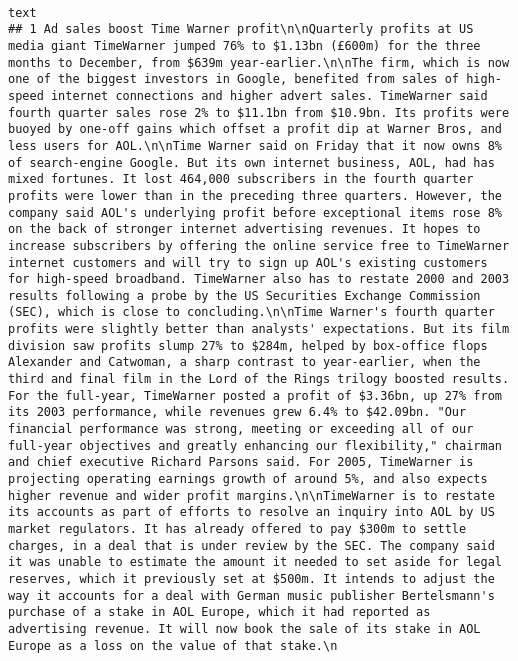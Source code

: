 \documentclass[
]{article}
\begin{document}
\begin{verbatim}
                                                                                                                    text
## 1 Ad sales boost Time Warner profit\n\nQuarterly profits at US media giant TimeWarner jumped 76% to $1.13bn (£600m) for the three months to December, from $639m year-earlier.\n\nThe firm, which is now one of the biggest investors in Google, benefited from sales of high-speed internet connections and higher advert sales. TimeWarner said fourth quarter sales rose 2% to $11.1bn from $10.9bn. Its profits were buoyed by one-off gains which offset a profit dip at Warner Bros, and less users for AOL.\n\nTime Warner said on Friday that it now owns 8% of search-engine Google. But its own internet business, AOL, had has mixed fortunes. It lost 464,000 subscribers in the fourth quarter profits were lower than in the preceding three quarters. However, the company said AOL's underlying profit before exceptional items rose 8% on the back of stronger internet advertising revenues. It hopes to increase subscribers by offering the online service free to TimeWarner internet customers and will try to sign up AOL's existing customers for high-speed broadband. TimeWarner also has to restate 2000 and 2003 results following a probe by the US Securities Exchange Commission (SEC), which is close to concluding.\n\nTime Warner's fourth quarter profits were slightly better than analysts' expectations. But its film division saw profits slump 27% to $284m, helped by box-office flops Alexander and Catwoman, a sharp contrast to year-earlier, when the third and final film in the Lord of the Rings trilogy boosted results. For the full-year, TimeWarner posted a profit of $3.36bn, up 27% from its 2003 performance, while revenues grew 6.4% to $42.09bn. "Our financial performance was strong, meeting or exceeding all of our full-year objectives and greatly enhancing our flexibility," chairman and chief executive Richard Parsons said. For 2005, TimeWarner is projecting operating earnings growth of around 5%, and also expects higher revenue and wider profit margins.\n\nTimeWarner is to restate its accounts as part of efforts to resolve an inquiry into AOL by US market regulators. It has already offered to pay $300m to settle charges, in a deal that is under review by the SEC. The company said it was unable to estimate the amount it needed to set aside for legal reserves, which it previously set at $500m. It intends to adjust the way it accounts for a deal with German music publisher Bertelsmann's purchase of a stake in AOL Europe, which it had reported as advertising revenue. It will now book the sale of its stake in AOL Europe as a loss on the value of that stake.\n

\end{verbatim}
\end{document}
